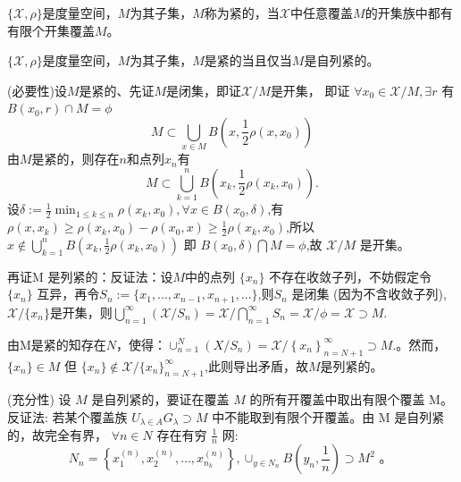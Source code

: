 \bigskip
\begin{definition}[紧集]
    $\{\mathscr{X}, \rho\}$是度量空间，$M$为其子集，$M$称为紧的，当$\mathscr{X}$中任意覆盖$M$的开集族中都有有限个开集覆盖$M$。
\end{definition}
\begin{theorem}
    $\{\mathscr{X},\rho\}$是度量空间，$M$为其子集，$M$是紧的当且仅当$M$是自列紧的。
\end{theorem}
\begin{solution}
    (必要性)设$M$是紧的、先证$M$是闭集，即证$\mathscr{X}/M$是开集， 即证 $\forall x_{0}\in \mathscr{X}/M,\exists r$ 有 $B\left(x_{0},r\right)\cap M=\phi$
    \begin{equation*}
        M\subset\bigcup\limits_{x\in M}B(x,\frac{1}{2}\rho(x,x_{0}))
    \end{equation*}
    由$M$是紧的，则存在$n$和点列$x_{n}$有
    \begin{equation*}
        M\subset\bigcup\limits_{k=1}^{n}B\left(x_{k},\frac{1}{2}\rho\left(x_{k},x_{0}\right)\right).
    \end{equation*} 
    设$\delta:=\frac{1}{2}\min_{1\leq k\leq n}\rho\left(x_{k},x_{0}\right),\forall x\in B\left(x_{0},\delta\right)$,有$\rho\left(x,x_{k}\right)\geq\rho\left(x_{k},x_{0}\right)-\rho\left(x_{0},x\right)\geq\frac{1}{2}\rho\left(x_{k},x_{0}\right)$,所以 $x\notin\bigcup\limits_{k=1}^nB(x_k,\frac{1}{2}\rho(x_k,x_0))$ 即 $B(x_0,\delta)\bigcap M=\phi$,故 $\mathscr{X}/M$ 是开集。

    再证M 是列紧的：反证法：设$M$中的点列 $\{x_n\}$ 不存在收敛子列，不妨假定令 $\{x_n\}$ 互异，再令$S_n:=\{x_1,...,x_{n-1},x_{n+1},...\}$,则$S_n$ 是闭集 (因为不含收敛子列),$\mathscr{X}/\{x_n\}$是开集，则$\bigcup\limits_{n=1}^{\infty}\left(\mathscr{X}/S_{n}\right) = \mathscr{X}/\bigcap\limits_{n=1}^{\infty}S_{n}=\mathscr{X}/\phi=\mathscr{X}\supset M.$

    由M是紧的知存在$N$，使得：$\cup_{n=1}^{N}\left(X/S_{n}\right)=\mathscr{X}/\left\{x_{n}\right\}_{n=N+1}^{\infty}\supset M.$。然而，$\{x_n\}\in M$ 但 $\{x_n\}\notin\mathscr{X}/\{x_n\}_{n=N+1}^{\infty}$,此则导出矛盾，故$M$是列紧的。

    (充分性) 设 $M$ 是自列紧的，要证在覆盖 $M$ 的所有开覆盖中取出有限个覆盖 M。
    反证法: 若某个覆盖族 $U_{\lambda \in A} G_\lambda \supset M$ 中不能取到有限个开覆盖。由 $\mathrm{M}$ 是自列紧的，故完全有界， $\forall n \in N$ 存在有穷 $\frac{1}{n}$ 网:
    $$
    N_n=\left\{x_1^{(n)}, x_2^{(n)}, \ldots, x_{n_k}^{(n)}\right\}, \cup_{y \in N_n} B\left(y_n, \frac{1}{n}\right) \supset M^2 \text { 。 }
    $$


\end{solution}

